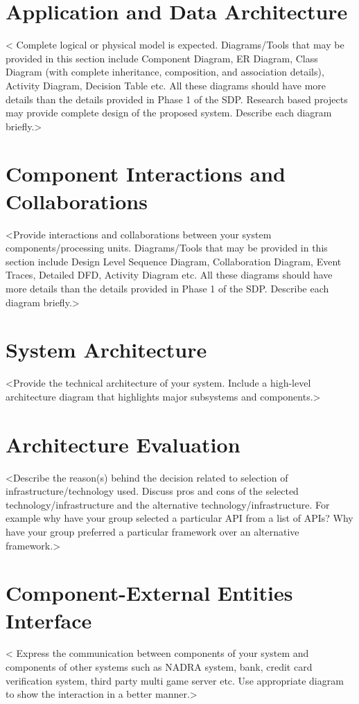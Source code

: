 \section{Application and Data Architecture}
< Complete logical or physical model is expected. Diagrams/Tools that may be provided in this section include Component Diagram, ER Diagram, Class Diagram (with complete inheritance, composition, and association details), Activity Diagram, Decision Table etc. All these diagrams should have more details than the details provided in Phase 1 of the SDP. Research based projects may provide complete design of the proposed system. Describe each diagram briefly.>

\section{Component Interactions and Collaborations}
<Provide interactions and collaborations between your system components/processing units. Diagrams/Tools that may be provided in this section include Design Level Sequence Diagram, Collaboration Diagram, Event Traces, Detailed DFD, Activity Diagram etc. All these diagrams should have more details than the details provided in Phase 1 of the SDP. Describe each diagram briefly.>

\section{System Architecture}
<Provide the technical architecture of your system. Include a high-level architecture diagram that highlights major subsystems and components.>

\section{Architecture Evaluation}
<Describe the reason(s) behind the decision related to selection of infrastructure/technology used. Discuss pros and cons of the selected technology/infrastructure and the alternative technology/infrastructure. For example why have your group selected a particular API from a list of APIs? Why have your group preferred a particular framework over an alternative framework.>

\section{Component-External Entities Interface}
< Express the communication between components of your system and components of other systems such as NADRA system, bank, credit card verification system, third party multi game server etc. Use appropriate diagram to show the interaction in a better manner.>

